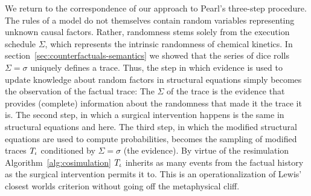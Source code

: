 We return to the correspondence of our approach to Pearl's three-step
procedure. The rules of a model do not themselves contain random
variables representing unknown causal factors. Rather, randomness
stems solely from the execution schedule $\Sigma$, which represents
the intrinsic randomness of chemical kinetics. In
section~\ref{sec:counterfactuals-semantics} we showed that the series
of dice rolls $\Sigma=\sigma$ uniquely defines a trace. Thus, the step
in which evidence is used to update knowledge about random factors in
structural equations simply becomes the observation of the factual
trace: The $\Sigma$ of the trace is the evidence that provides
(complete) information about the randomness that made it the trace it
is. The second step, in which a surgical intervention happens is the
same in structural equations and here. The third step, in which the
modified structural equations are used to compute probabilities,
becomes the sampling of modified traces ${T_\iota}{}$ conditioned by
$\Sigma=\sigma$ (the evidence). By virtue of the resimulation
Algorithm~\ref{alg:cosimulation} ${T_\iota}{}$ inherits as many events
from the factual history as the surgical intervention permits it
to. This is an operationalization of Lewis' closest worlds criterion
without going off the metaphysical cliff.

% 
